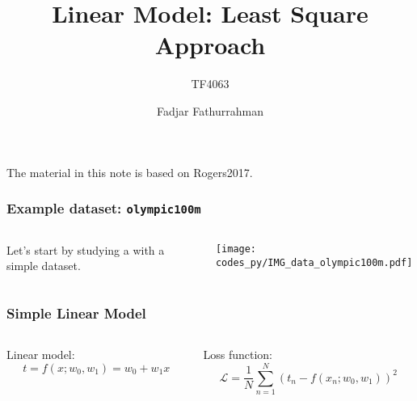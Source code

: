 \documentclass[english,10pt,aspectratio=169,fleqn]{beamer}
\begin{document}
\title{Linear Model: Least Square Approach}
\subtitle{TF4063}
\author{Fadjar Fathurrahman}
\date{}


\frame{\titlepage}

\begin{frame} %

The material in this note is based on Rogers2017.

\end{frame} %


\begin{frame} %
\frametitle{Example dataset: {\tt olympic100m}}
\begin{columns}
  \begin{column}{0.4\textwidth}
  Let's start by studying a with a simple dataset.
  \end{column}
  \begin{column}{0.6\textwidth}
  {\centering
  \texttt{[image: codes\_py/IMG\_data\_olympic100m.pdf]}
  \par}
  \end{column}
\end{columns}
\end{frame} %


\begin{frame} %
\frametitle{Simple Linear Model}

\begin{columns}
  \begin{column}{0.5\textwidth}
  Linear model:
  \begin{equation*}
  t = f(x; w_0, w_1) = w_0 + w_1 x
  \label{eq:model_linear_01}
  \end{equation*}
  \end{column}
  \begin{column}{0.5\textwidth}
  Loss function:
  \begin{equation*}
  \mathcal{L} =
  \frac{1}{N} \sum_{n=1}^{N} \left( t_n - f(x_n; w_0, w_1) \right)^2
  \label{eq:loss_function_01}
  \end{equation*}
  \end{column}
\end{columns}

\end{frame} %
\end{document}
